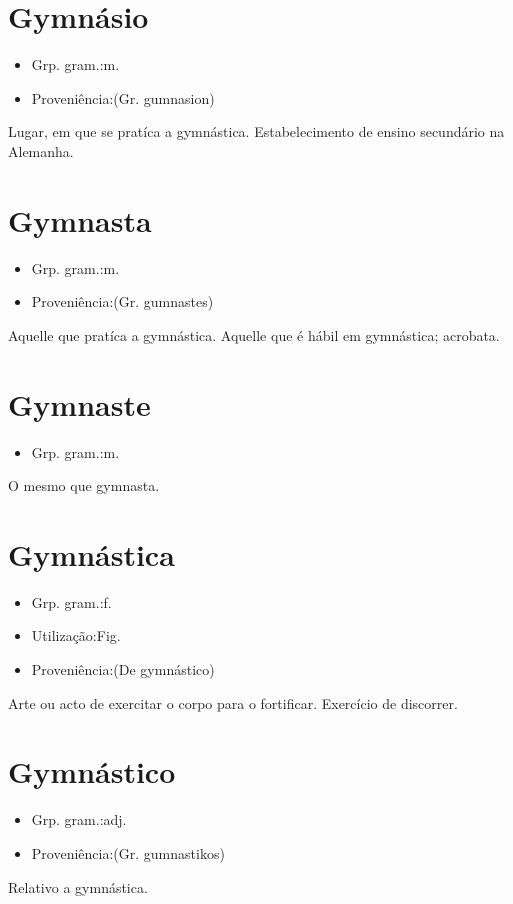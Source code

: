 \section{Gymnásio}
\begin{itemize}
\item {Grp. gram.:m.}
\end{itemize}
\begin{itemize}
\item {Proveniência:(Gr. \textunderscore gumnasion\textunderscore )}
\end{itemize}
Lugar, em que se pratíca a gymnástica.
Estabelecimento de ensino secundário na Alemanha.
\section{Gymnasta}
\begin{itemize}
\item {Grp. gram.:m.}
\end{itemize}
\begin{itemize}
\item {Proveniência:(Gr. \textunderscore gumnastes\textunderscore )}
\end{itemize}
Aquelle que pratíca a gymnástica.
Aquelle que é hábil em gymnástica; acrobata.
\section{Gymnaste}
\begin{itemize}
\item {Grp. gram.:m.}
\end{itemize}
O mesmo que \textunderscore gymnasta\textunderscore .
\section{Gymnástica}
\begin{itemize}
\item {Grp. gram.:f.}
\end{itemize}
\begin{itemize}
\item {Utilização:Fig.}
\end{itemize}
\begin{itemize}
\item {Proveniência:(De \textunderscore gymnástico\textunderscore )}
\end{itemize}
Arte ou acto de exercitar o corpo para o fortificar.
Exercício de discorrer.
\section{Gymnástico}
\begin{itemize}
\item {Grp. gram.:adj.}
\end{itemize}
\begin{itemize}
\item {Proveniência:(Gr. \textunderscore gumnastikos\textunderscore )}
\end{itemize}
Relativo a gymnástica.
